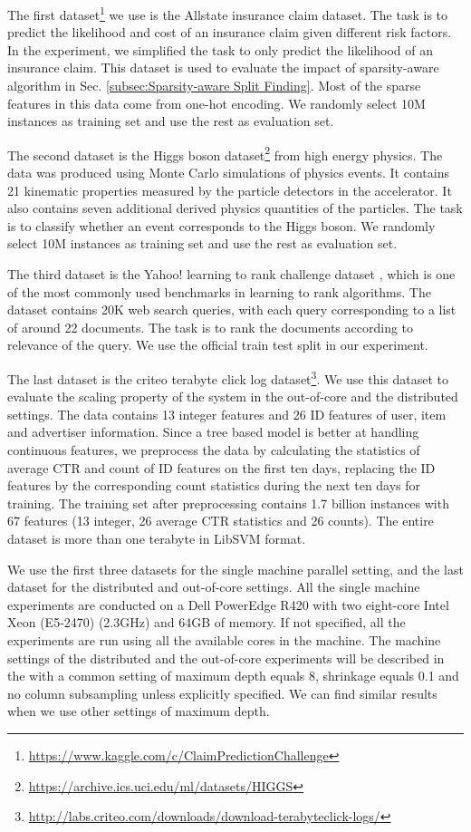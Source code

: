 \documentclass[sigconf]{acmart}
\begin{document}
The first dataset\footnote{\url{https://www.kaggle.com/c/ClaimPredictionChallenge}} we use is the Allstate insurance claim dataset. The task is to predict the likelihood and cost of
an insurance claim given different risk factors. In the experiment, we simplified the task to only predict the likelihood
of an insurance claim. This dataset is used to evaluate the impact of sparsity-aware algorithm in 
Sec. \ref{subsec:Sparsity-aware Split Finding}. Most of the sparse features in this data come from one-hot encoding. We
randomly select 10M instances as training set and use the rest as evaluation set.

The second dataset is the Higgs boson dataset\footnote{\url{https://archive.ics.uci.edu/ml/datasets/HIGGS}} from high energy physics. The data was produced using Monte Carlo
simulations of physics events. It contains 21 kinematic properties measured by the particle detectors in the accelerator.
It also contains seven additional derived physics quantities of the particles. The task is to classify whether an event
corresponds to the Higgs boson. We randomly select 10M instances as training set and use the rest as evaluation set.

The third dataset is the Yahoo! learning to rank challenge dataset \cite{chapelle2011yahoo}, which is one of the most commonly used benchmarks 
in learning to rank algorithms. The dataset contains 20K web search queries, with each query corresponding to a
list of around 22 documents. The task is to rank the documents according to relevance of the query. We use the official
train test split in our experiment.

The last dataset is the criteo terabyte click log dataset\footnote{\url{http://labs.criteo.com/downloads/download-terabyteclick-logs/}}. We use this dataset to evaluate the scaling property of the
system in the out-of-core and the distributed settings. The data contains 13 integer features and 26 ID features of user,
item and advertiser information. Since a tree based model is better at handling continuous features, we preprocess the
data by calculating the statistics of average CTR and count of ID features on the first ten days, replacing the ID 
features by the corresponding count statistics during the next ten days for training. The training set after preprocessing
contains 1.7 billion instances with 67 features (13 integer, 26 average CTR statistics and 26 counts). The entire dataset
is more than one terabyte in LibSVM format.

We use the first three datasets for the single machine parallel setting, and the last dataset for the distributed and
out-of-core settings. All the single machine experiments are conducted on a Dell PowerEdge R420 with two eight-core
Intel Xeon (E5-2470) (2.3GHz) and 64GB of memory. If not specified, all the experiments are run using all the available
cores in the machine. The machine settings of the distributed and the out-of-core experiments will be described in the
with a common setting of maximum depth equals 8, shrinkage equals 0.1 and no column subsampling unless explicitly
specified. We can find similar results when we use other settings of maximum depth.
\end{document}

